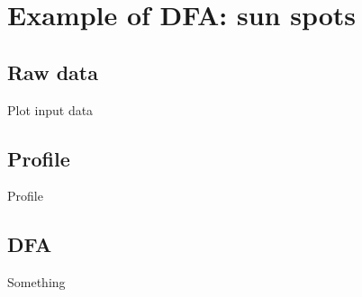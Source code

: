 \section{Example of DFA: sun spots}
\graphicspath{{../sunSpots/img/}}

\subsection{Raw data}
Plot input data

\begin{figure}[ht]
	
\end{figure}

\subsection{Profile}
Profile

\begin{figure}[ht]
	
\end{figure}

\subsection{DFA}
Something

\begin{figure}[ht]
	
\end{figure}